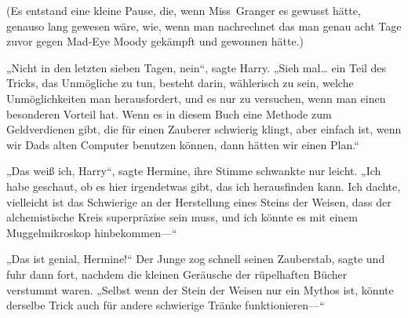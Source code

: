 (Es entstand eine kleine Pause, die, wenn Miss~Granger es gewusst hätte, genauso lang gewesen wäre, wie, wenn man nachrechnet das man genau acht Tage zuvor gegen Mad-Eye Moody gekämpft und gewonnen hätte.)

„Nicht in den letzten sieben Tagen, nein“, sagte Harry. „Sieh mal… ein Teil des Tricks, das Unmögliche zu tun, besteht darin, wählerisch zu sein, welche Unmöglichkeiten man herausfordert, und es nur zu versuchen, wenn man einen besonderen Vorteil hat. Wenn es in diesem Buch eine Methode zum Geldverdienen gibt, die für einen Zauberer schwierig klingt, aber einfach ist, wenn wir Dads alten Computer benutzen können, dann hätten wir einen Plan.“

„Das weiß ich, Harry“, sagte Hermine, ihre Stimme schwankte nur leicht. „Ich habe geschaut, ob es hier irgendetwas gibt, das ich herausfinden kann. Ich dachte, vielleicht ist das Schwierige an der Herstellung eines Steins der Weisen, dass der alchemistische Kreis superpräzise sein muss, und ich könnte es mit einem Muggelmikroskop hinbekommen—“

„Das ist genial, Hermine!“ Der Junge zog schnell seinen Zauberstab, sagte  und fuhr dann fort, nachdem die kleinen Geräusche der rüpelhaften Bücher verstummt waren. „Selbst wenn der Stein der Weisen nur ein Mythos ist, könnte derselbe Trick auch für andere schwierige Tränke funktionieren—“

